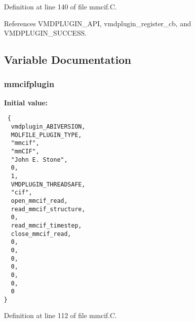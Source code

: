 Definition at line 140 of file mmcif.C.

References VMDPLUGIN\_\-API, vmdplugin\_\-register\_\-cb, and VMDPLUGIN\_\-SUCCESS.

\subsection{Variable Documentation}
\subsubsection{ mmcifplugin\hspace{0.3cm}{\tt  [static]}}\label{mmcif_8C_a0}


{\bf Initial value:}

\footnotesize\begin{verbatim} {
  vmdplugin_ABIVERSION,
  MOLFILE_PLUGIN_TYPE,                         
  "mmcif",                                     
  "mmCIF",                                     
  "John E. Stone",                             
  0,                                           
  1,                                           
  VMDPLUGIN_THREADSAFE,                        
  "cif",                                       
  open_mmcif_read,
  read_mmcif_structure,
  0,
  read_mmcif_timestep,
  close_mmcif_read,
  0,
  0,
  0,
  0,
  0,                            
  0,                            
  0                             
}\end{verbatim}\normalsize 


Definition at line 112 of file mmcif.C.
